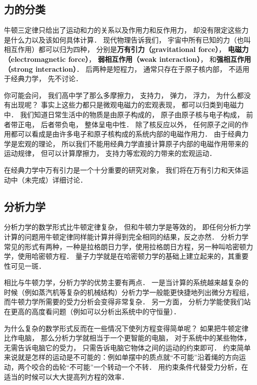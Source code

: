 \subsection{力的分类}
牛顿三定律只给出了运动和力的关系以及作用力和反作用力， 却没有限定这些力是什么力以及该如何具体计算． 现代物理告诉我们， 宇宙中所有已知的力（也叫相互作用）都可以归为四种， 分别是\textbf{万有引力（gravitational force）}， \textbf{电磁力（electromagnetic force）}， \textbf{弱相互作用（weak interaction）}， 和\textbf{强相互作用（strong interaction）}． 后两种是短程力， 通常只存在于原子核内部， 不适用于经典力学， 先不讨论．

你可能会问， 我们高中学了那么多摩擦力， 支持力， 弹力， 浮力， 为什么都没有出现呢？ 事实上这些力都只是微观电磁力的宏观表现， 都可以归类到电磁力中． 我们知道日常生活中的物质是由原子构成的， 原子由原子核与电子构成， 前者带正电， 后者带负电， 整体呈电中性． 除了核反应以外， 任何原子之间的作用都可以看成是由许多电子和原子核构成的系统内部的电磁作用力． 由于经典力学是宏观的理论， 所以我们不能用经典力学直接计算原子内部的电磁作用带来的运动规律， 但可以计算摩擦力， 支持力等宏观的力带来的宏观运动．

在经典力学中万有引力是一个十分重要的研究对象， 我们将在万有引力和天体运动中（未完成）详细讨论．

\subsection{分析力学}
分析力学的数学形式比牛顿定律复杂， 但和牛顿力学是等效的， 即任何分析力学计算的问题用牛顿定律同样能计算并得到完全相同的结果，反之亦然． 分析力学常见的形式有两种，一种是拉格朗日力学，使用拉格朗日方程，另一种叫哈密顿力学，使用哈密顿方程． 量子力学就是在哈密顿力学的基础上建立起来的，其重要性可见一斑．%

相比与牛顿力学，分析力学的优势主要有两点． 一是当计算的系统越来越复杂的时候（例如蒸汽机等复杂的机械结构）分析力学一般能更快捷地列出微分方程组， 而牛顿力学所需要的受力分析会变得非常复杂． 另一方面， 分析力学能使我们站在更高的高度看问题（例如可以分析出系统中的守恒量）．

为什么复杂的数学形式反而在一些情况下使列方程变得简单呢？ 如果把牛顿定律比作电脑， 那么分析力学就相当于一个更智能的电脑， 对于系统中的某些物体， 无需告诉电脑它的受力， 只需告诉电脑它物体之间的运动的约束即可． 约束简单来说就是怎样的运动是不可能的：例如单摆中的质点就“不可能”沿着绳的方向运动，两个咬合的齿轮“不可能”一个转动一个不转． 用约束条件代替受力分析，在适当的时候可以大大提高列方程的效率．

